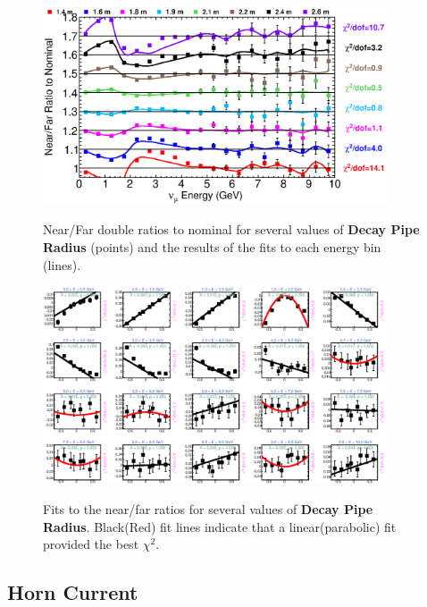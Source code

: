 \begin{figure}[ht]
  \begin{center}
    {\includegraphics[width=4.0in]{figures/DecayPipeRadius_nof_summary.eps}}
  \end{center}
\caption{ Near/Far double ratios to nominal for several values of {\bf Decay Pipe Radius} (points) and the results of the fits to each energy bin (lines).}
\end{figure}

\begin{figure}[hb]
  \begin{center}
    {\includegraphics[width=4.0in]{figures/DecayPipeRadius_nof_fits.eps}}
  \end{center}
\caption{ Fits to the near/far ratios for several values of {\bf Decay Pipe Radius}. Black(Red) fit lines indicate that a linear(parabolic) fit provided the best $\chi^2$. }
\end{figure}

\clearpage
\subsection{Horn Current}

